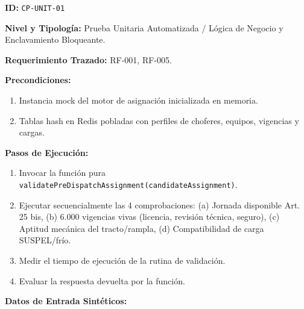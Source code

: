 \par\noindent\textbf{ID:} \texttt{C\allowbreak{}P\allowbreak{}-\allowbreak{}U\allowbreak{}N\allowbreak{}I\allowbreak{}T\allowbreak{}-\allowbreak{}0\allowbreak{}1\allowbreak{}}\par
\par\noindent\textbf{Nivel y Tipología:} Prueba Unitaria Automatizada / Lógica de Negocio y Enclavamiento Bloqueante.\par
\par\noindent\textbf{Requerimiento Trazado:} RF-001, RF-005.\par
\par\noindent\textbf{Precondiciones:} \par
\begin{enumerate}
\item Instancia mock del motor de asignación inicializada en memoria.
\item Tablas hash en Redis pobladas con perfiles de choferes, equipos, vigencias y cargas.
\end{enumerate}
\par\noindent\textbf{Pasos de Ejecución:} \par
\begin{enumerate}
\item Invocar la función pura \texttt{v\allowbreak{}a\allowbreak{}l\allowbreak{}i\allowbreak{}d\allowbreak{}a\allowbreak{}t\allowbreak{}e\allowbreak{}P\allowbreak{}r\allowbreak{}e\allowbreak{}D\allowbreak{}i\allowbreak{}s\allowbreak{}p\allowbreak{}a\allowbreak{}t\allowbreak{}c\allowbreak{}h\allowbreak{}A\allowbreak{}s\allowbreak{}s\allowbreak{}i\allowbreak{}g\allowbreak{}n\allowbreak{}m\allowbreak{}e\allowbreak{}n\allowbreak{}t\allowbreak{}(\allowbreak{}c\allowbreak{}a\allowbreak{}n\allowbreak{}d\allowbreak{}i\allowbreak{}d\allowbreak{}a\allowbreak{}t\allowbreak{}e\allowbreak{}A\allowbreak{}s\allowbreak{}s\allowbreak{}i\allowbreak{}g\allowbreak{}n\allowbreak{}m\allowbreak{}e\allowbreak{}n\allowbreak{}t\allowbreak{})\allowbreak{}}.
\item Ejecutar secuencialmente las 4 comprobaciones: (a) Jornada disponible Art. 25 bis, (b) 6.000 vigencias vivas (licencia, revisión técnica, seguro), (c) Aptitud mecánica del tracto/rampla, (d) Compatibilidad de carga SUSPEL/frío.
\item Medir el tiempo de ejecución de la rutina de validación.
\item Evaluar la respuesta devuelta por la función.
\end{enumerate}
\par\noindent\textbf{Datos de Entrada Sintéticos:} \par
